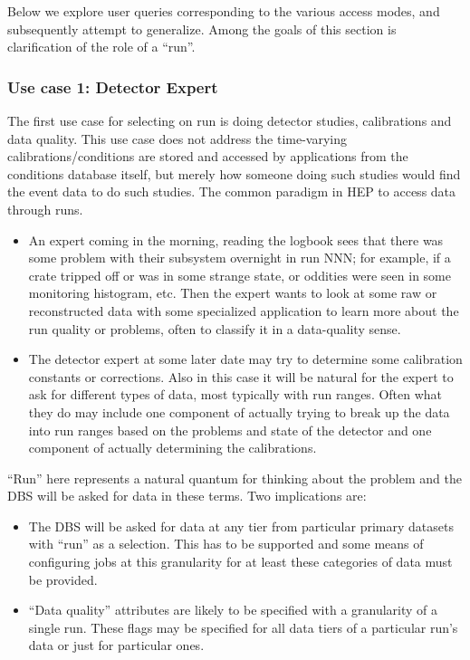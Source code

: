 \documentclass[pdftex]{cmspaper}
\begin{document}
{Below we explore user queries corresponding to the various access modes,
and subsequently attempt to generalize. Among the goals of this section
is clarification of the role of a ``run''.

\subsubsection{Use case 1: Detector Expert}

  The first use case for selecting on run is doing detector studies,
calibrations and data quality. This use case does not address the
time-varying calibrations/conditions are stored and accessed by
applications from the conditions database itself, but merely how someone
doing such studies would find the event data to do such studies. The
common paradigm in HEP to access data through runs.

\begin{itemize}

\item An expert coming in the morning, reading the logbook sees that there was
     some problem with their subsystem overnight in run NNN; for example,
     if a crate tripped off or was in some strange state, or oddities
     were seen in some monitoring histogram, etc. Then the expert wants
     to look at some raw or reconstructed data with some specialized
     application to learn more about the run quality or problems, often
     to classify it in a data-quality sense.

\item The detector expert at some later date may try to determine
     some calibration constants or corrections. Also in this case it
     will be natural for the expert to ask for different types of data,
     most typically with run ranges. Often what they do may include one
     component of actually trying to break up the data into run ranges
     based on the problems and state of the detector and one component
     of actually determining the calibrations.

\end{itemize}

``Run'' here represents a natural quantum for thinking about the problem and
the DBS will be asked for data in these terms. Two implications are:
\begin{itemize}
\item The DBS will be asked for data at any tier from particular
    primary datasets with ``run'' as a selection. This has to be supported and
    some means of configuring jobs at this granularity for at least these
    categories of data must be provided.
\item ``Data quality'' attributes are likely 
    to be specified with a granularity of a single run. These flags may be
    specified for all data tiers of a particular run's data or just
    for particular ones. 
\end{itemize}

}
\end{document}
